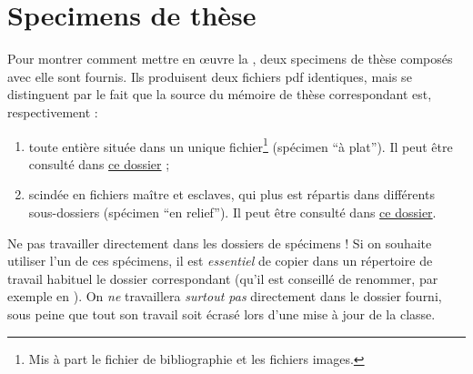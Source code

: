\chapter{Specimens de thèse}\label{cha:specimen}

Pour montrer comment mettre en œuvre la \yatcl, deux specimens de thèse
composés avec elle sont fournis.  Ils produisent deux fichiers \gls{pdf}
identiques, mais se distinguent par le fait que la source  du
mémoire de thèse correspondant est, respectivement :
\begin{enumerate}
\item toute entière située dans un unique fichier\footnote{Mis à part le
    fichier de bibliographie et les fichiers images.} (spécimen \enquote{à
    plat}). Il peut être consulté dans \href{single-file-template/.}{ce dossier} ;
\item scindée en fichiers maître et esclaves, qui plus est répartis dans
  différents sous-dossiers (spécimen \enquote{en relief}). Il peut être
  consulté dans \href{master-slaves-files-template/.}{ce dossier}.
\end{enumerate}


\begin{dbwarning}{Ne pas travailler directement dans les dossiers de
    spécimens !}{}
  Si on souhaite utiliser l'un de ces spécimens, il est \emph{essentiel} de
  copier dans un répertoire de travail habituel le dossier correspondant (qu'il
  est conseillé de renommer, par exemple en ). On \emph{ne}
  travaillera \emph{surtout pas} directement dans le dossier fourni, sous peine
  que tout son travail soit écrasé lors d'une mise à jour de la classe.
\end{dbwarning}

